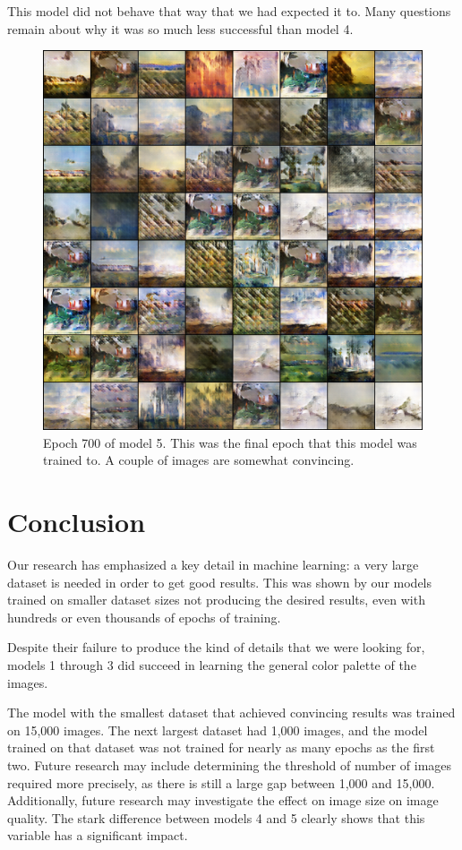 \documentclass[11pt,letterpaper]{article}
\begin{document}
				This model did not behave that way that we had expected it to.
				Many questions remain about why it was so much less successful than model 4.
				\begin{figure}
					\centering
					\includegraphics[width=1.0\linewidth]{results/model5/epoch700_generator}
					\caption{Epoch 700 of model 5. This was the final epoch that this model was trained to. A couple of images are somewhat convincing.}
					\label{fig:wa128:epoch700generator}
				\end{figure}

	\section{Conclusion}
		Our research has emphasized a key detail in machine learning: a very large dataset is needed in order to get good results.
		This was shown by our models trained on smaller dataset sizes not producing the desired results, even with hundreds or even thousands of epochs of training.

		Despite their failure to produce the kind of details that we were looking for, models 1 through 3 did succeed in learning the general color palette of the images.

		The model with the smallest dataset that achieved convincing results was trained on 15,000 images.
		The next largest dataset had 1,000 images, and the model trained on that dataset was not trained for nearly as many epochs as the first two.
		Future research may include determining the threshold of number of images required more precisely, as there is still a large gap between 1,000 and 15,000.
		Additionally, future research may investigate the effect on image size on image quality.
		The stark difference between models 4 and 5 clearly shows that this variable has a significant impact.
\end{document}
